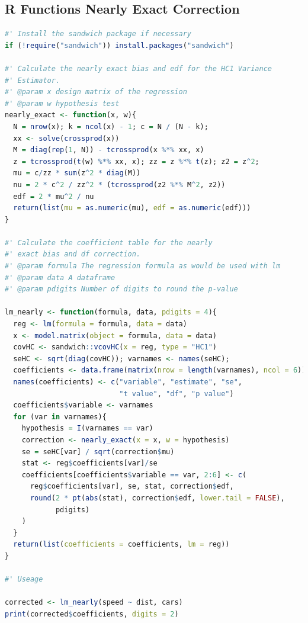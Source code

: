 \documentclass[12pt]{article}
\begin{document}
\subsection{R Functions Nearly Exact Correction} \label{appendix-R}
\begin{lstlisting}[language=R]
#' Install the sandwich package if necessary
if (!require("sandwich")) install.packages("sandwich")

#' Calculate the nearly exact bias and edf for the HC1 Variance
#' Estimator.
#' @param x design matrix of the regression
#' @param w hypothesis test
nearly_exact <- function(x, w){
  N = nrow(x); k = ncol(x) - 1; c = N / (N - k);
  xx <- solve(crossprod(x))
  M = diag(rep(1, N)) - tcrossprod(x %*% xx, x)
  z = tcrossprod(t(w) %*% xx, x); zz = z %*% t(z); z2 = z^2;
  mu = c/zz * sum(z^2 * diag(M))
  nu = 2 * c^2 / zz^2 * (tcrossprod(z2 %*% M^2, z2))
  edf = 2 * mu^2 / nu
  return(list(mu = as.numeric(mu), edf = as.numeric(edf)))
}

#' Calculate the coefficient table for the nearly
#' exact bias and df correction.
#' @param formula The regression formula as would be used with lm
#' @param data A dataframe
#' @param pdigits Number of digits to round the p-value

lm_nearly <- function(formula, data, pdigits = 4){
  reg <- lm(formula = formula, data = data)
  x <- model.matrix(object = formula, data = data)
  covHC <- sandwich::vcovHC(x = reg, type = "HC1")
  seHC <- sqrt(diag(covHC)); varnames <- names(seHC); 
  coefficients <- data.frame(matrix(nrow = length(varnames), ncol = 6))
  names(coefficients) <- c("variable", "estimate", "se",
                           "t value", "df", "p value")
  coefficients$variable <- varnames
  for (var in varnames){
    hypothesis = I(varnames == var)
    correction <- nearly_exact(x = x, w = hypothesis)
    se = seHC[var] / sqrt(correction$mu)
    stat <- reg$coefficients[var]/se
    coefficients[coefficients$variable == var, 2:6] <- c(
      reg$coefficients[var], se, stat, correction$edf, 
      round(2 * pt(abs(stat), correction$edf, lower.tail = FALSE),
            pdigits)
    )
  }
  return(list(coefficients = coefficients, lm = reg))
}

#' Useage

corrected <- lm_nearly(speed ~ dist, cars)
print(corrected$coefficients, digits = 2)
\end{lstlisting}
\end{document}

